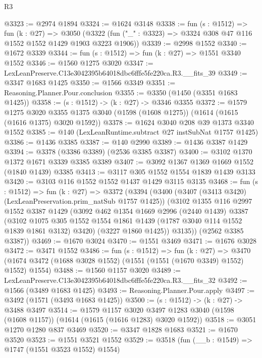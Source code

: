 \begin{lexlean}{R3}
\begin{coremodule}
@3323 := @2974 @1894
@3324 := @1624 @3148
@3338 := fun (s : @1512) =>
  fun (k : @27) =>
  @3050 (@3322 (fun ("_" : @3323) => @3324 @308 @47 @116 @1552 @1552 @1429 @1903 @3223 @1906))
@3339 := @2998 @1552
@3340 := @1672 @3339
@3344 := fun (s : @1512) => fun (k : @27) => @1551 @3340 @1552
@3346 := @1560 @1275 @3020
@3347 := LexLeanPreserve.C13e3042395b64018dbc6fffe5fe220ca.R3.__fits_39
@3349 := @3347 @1683 @1425
@3350 := @1566 @3349
@3351 := Reasoning.Planner.Pour.conclusion
@3355 := @3350 (@1450 (@3351 @1683 @1425))
@3358 := (s : @1512) -> (k : @27) -> @3346 @3355
@3372 := @1579
    @1275
    @3020
    @3355
    @1375
    @3040
    (@1598 (@1608 @1275))
    (@1614 (@1615 (@1616 @1375) @3020 @1592))
@3378 := @1624 @3040 @208 @39 @1373 @3340 @1552
@3385 := @140 (LexLeanRuntime.subtract @27 instSubNat @1757 @1425)
@3386 := @1436 @3385
@3387 := @140 @2990
@3389 := @1436 @3387 @1429
@3394 := @3378 (@3386 @3389) (@2536 @3385 @3387)
@3400 := @3102 @1370 @1372 @1671 @3339 @3385 @3389
@3407 := @3092 @1367 @1369 @1669 @1552 (@1840 @1439) @3385
@3413 := @3117 @305 @1552 @1554 @1839 @1439 @3133
@3420 := @3103 @116 @1552 @1552 @1437 @1429 @3115 @3135
@3468 := fun (s : @1512) =>
  fun (k : @27) =>
  @3372
    (@3394
      (@3400
        (@3407 (@3413 @3420) (LexLeanPreservation.prim_natSub @1757 @1425))
        (@3102
          @1355
          @116
          @2997
          @1552
          @3387
          @1429
          (@3092
            @462
            @1354
            @1669
            @2996
            (@2440 @1439)
            @3387
            (@3102
              @1075
              @305
              @1552
              @1554
              @1861
              @1439
              (@1787 @3040 @114 @1552 @1839 @1861 @3132)
              @3420)
            (@3227 @1860 @1425))
          @3135))
      (@2562 @3385 @3387))
@3469 := @1670 @3024
@3470 := @1551 @3469
@3471 := @1676 @3028
@3472 := @3471 @1552
@3486 := fun (s : @1512) =>
  fun (k : @27) =>
  @3470 (@1674 @3472 (@1688 @3028 @1552) (@1551 (@1551 (@1670 @3349) @1552) @1552) @1554)
@3488 := @1560 @1157 @3020
@3489 := LexLeanPreserve.C13e3042395b64018dbc6fffe5fe220ca.R3.__fits_32
@3492 := @1566 (@3489 @1683 @1425)
@3493 := Reasoning.Planner.Pour.apply
@3497 := @3492 (@1571 (@3493 @1683 @1425))
@3500 := (s : @1512) -> (k : @27) -> @3488 @3497
@3514 := @1579
    @1157
    @3020
    @3497
    @1283
    @3040
    (@1598 (@1608 @1157))
    (@1614 (@1615 (@1616 @1283) @3020 @1592))
@3518 := @3051 @1270 @1280 @837 @3469
@3520 := @3347 @1828 @1683
@3521 := @1670 @3520
@3523 := @1551 @3521 @1552
@3529 := @3518 (fun (__b : @1549) => @1747 (@1551 @3523 @1552) @1554)

\end{coremodule}
\end{lexlean}
